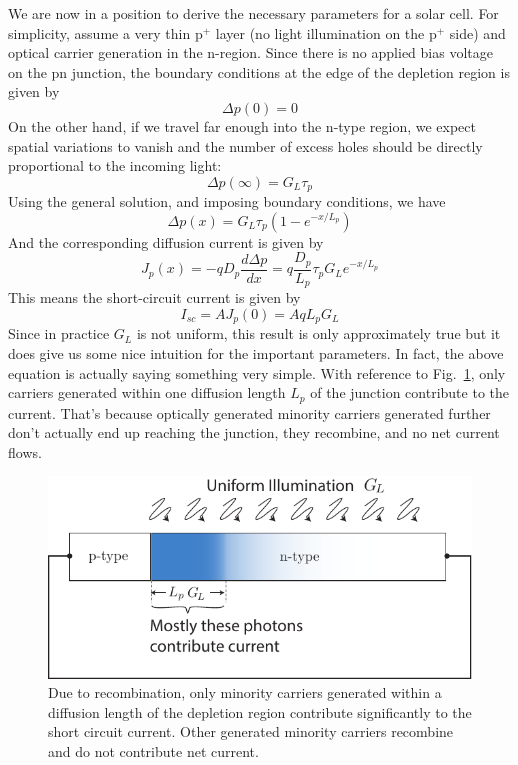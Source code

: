 We are now in a position to derive the necessary parameters for a solar cell.   For simplicity, assume a very thin p$^+$ layer (no light illumination on the p$^+$ side) and optical carrier generation in the n-region.  Since there is no applied bias voltage on the pn junction, the boundary conditions at the edge of the depletion region is given by
%
\begin{equation} 
	\Delta p(0) = 0  
\end{equation}
%
On the other hand, if we travel far enough into the n-type region, we expect spatial variations to vanish and the number of excess holes should be directly proportional to the incoming light:
\begin{equation} 
	\Delta p(\infty) = G_L \tau_p  
\end{equation}
%
Using the general solution, and imposing boundary conditions, we have 
%
\begin{equation} 
	\Delta p(x) = G_L \tau_p \left(1 - e^{-x/L_p} \right)   
\end{equation}
%
 And the corresponding diffusion current is given by
%
\begin{equation} 
	J_p(x) = - q D_p \frac{d \Delta p}{dx} = q \frac{D_p}{L_p}  \tau_p G_L  e^{-x/L_p}  
\end{equation}
%
This means the short-circuit current is given by
%
\begin{equation} 
	I_{sc} = A J_p(0) = A q L_p G_L 
\end{equation}
%
Since in practice $G_L$ is not uniform, this result is only approximately true but it does give us some nice intuition for the important parameters.   In fact, the above equation is actually saying something very simple.  With reference to Fig.~\ref{fig:solar_cell_region}, only carriers generated within one diffusion length $L_p$ of the junction contribute to the current.  That's because optically generated minority carriers generated further don't actually end up reaching the junction, they recombine, and no net current flows.
 


\begin{figure}[tb]
\begin{center}
\includegraphics[width=.5\columnwidth]{solar_cell_region}
\end{center}
\caption{Due to recombination, only minority carriers generated within a diffusion length of the depletion region contribute significantly to the short circuit current.  Other generated minority carriers recombine and do not contribute net current.} \label{fig:solar_cell_region}
\end{figure}






